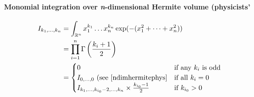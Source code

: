\documentclass{scrartcl}
\begin{document}
\paragraph{Monomial integration over \textit{n}-dimensional Hermite volume (physicists'}
\[
  \begin{split}
  I_{k_1,\dots,k_n}
  &= \int_{\mathbb{R}^n} x_1^{k_1}\dots x_n^{k_n} \exp(-(x_1^2+\dots+x_n^2))\\
  &= \prod_{i=1}^n \Gamma\left(\frac{k_i+1}{2}\right)\\
  &=\begin{cases}
    0&\text{if any $k_i$ is odd}\\
    I_{0,\dots,0} \text{ (see \eqref{ndimhermitephys}}&\text{if all $k_i=0$}\\
    I_{k_1,\dots,k_{i_0}-2,\dots,k_n} \times \frac{k_{i_0} - 1}{2}&\text{if $k_{i_0} > 0$}
  \end{cases}
\end{split}
\]


{}

\end{document}
